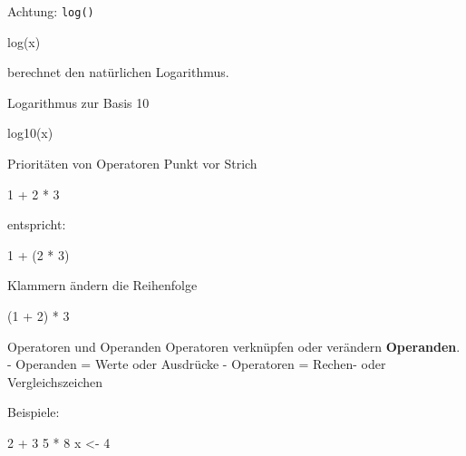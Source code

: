 \documentclass[
  10pt,
  ignorenonframetext,
  aspectratio=169,
]{beamer}
\newenvironment{Shaded}{}{}
\newcommand{\DecValTok}[1]{\textcolor[rgb]{0.25,0.63,0.44}{#1}}
\newcommand{\FunctionTok}[1]{\textcolor[rgb]{0.02,0.16,0.49}{#1}}
\newcommand{\NormalTok}[1]{#1}
\newcommand{\OtherTok}[1]{\textcolor[rgb]{0.00,0.44,0.13}{#1}}
\newcommand{\SpecialCharTok}[1]{\textcolor[rgb]{0.25,0.44,0.63}{#1}}
\begin{document}
\begin{frame}[fragile]{Achtung: \texttt{log()}}
\label{achtung-log}
\begin{Shaded}
\begin{Highlighting}[]
\FunctionTok{log}\NormalTok{(x)}
\end{Highlighting}
\end{Shaded}

berechnet den natürlichen Logarithmus.

Logarithmus zur Basis 10

\begin{Shaded}
\begin{Highlighting}[]
\FunctionTok{log10}\NormalTok{(x)}
\end{Highlighting}
\end{Shaded}
\end{frame}

\begin{frame}[fragile]{Prioritäten von Operatoren}
\label{priorituxe4ten-von-operatoren}
Punkt vor Strich

\begin{Shaded}
\begin{Highlighting}[]
\DecValTok{1} \SpecialCharTok{+} \DecValTok{2} \SpecialCharTok{*} \DecValTok{3}
\end{Highlighting}
\end{Shaded}

entspricht:

\begin{Shaded}
\begin{Highlighting}[]
\DecValTok{1} \SpecialCharTok{+}\NormalTok{ (}\DecValTok{2} \SpecialCharTok{*} \DecValTok{3}\NormalTok{)}
\end{Highlighting}
\end{Shaded}

Klammern ändern die Reihenfolge

\begin{Shaded}
\begin{Highlighting}[]
\NormalTok{(}\DecValTok{1} \SpecialCharTok{+} \DecValTok{2}\NormalTok{) }\SpecialCharTok{*} \DecValTok{3}
\end{Highlighting}
\end{Shaded}
\end{frame}

\begin{frame}[fragile]{Operatoren und Operanden}
\label{operatoren-und-operanden}
Operatoren verknüpfen oder verändern \textbf{Operanden}. - Operanden =
Werte oder Ausdrücke - Operatoren = Rechen- oder Vergleichszeichen

Beispiele:

\begin{Shaded}
\begin{Highlighting}[]
\DecValTok{2} \SpecialCharTok{+} \DecValTok{3}
\DecValTok{5} \SpecialCharTok{*} \DecValTok{8}
\NormalTok{x }\OtherTok{\textless{}{-}} \DecValTok{4}
\end{Highlighting}
\end{Shaded}
\end{frame}
\end{document}
